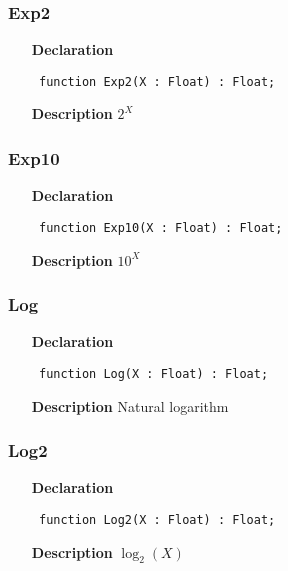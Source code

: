 \documentclass[12pt,a4paper,oneside]{report}
\newcommand{\declarationitem}[1]{\textbf{#1}}
\newcommand{\descriptiontitle}[1]{\textbf{#1}}
\newcommand{\code}[1]{\texttt{#1}}
\begin{document}
\subsubsection{Exp2}
\label{umath-Exp2}
\begin{itemize}\item[\declarationitem{Declaration}\hfill]
	\begin{flushleft}
		\code{
			function Exp2(X : Float) : Float;}
		
	\end{flushleft}
	
	\par
	\item[\descriptiontitle{Description}]
	$2^X$
	
\end{itemize}
\subsubsection{Exp10}
\label{umath-Exp10}
\begin{itemize}\item[\declarationitem{Declaration}\hfill]
	\begin{flushleft}
		\code{
			function Exp10(X : Float) : Float;}
		
	\end{flushleft}
	
	\par
	\item[\descriptiontitle{Description}]
	$10^X$
	
\end{itemize}
\subsubsection{Log}
\label{umath-Log}
\begin{itemize}\item[\declarationitem{Declaration}\hfill]
	\begin{flushleft}
		\code{
			function Log(X : Float) : Float;}
		
	\end{flushleft}
	
	\par
	\item[\descriptiontitle{Description}]
	Natural logarithm
	
\end{itemize}
\subsubsection{Log2}
\label{umath-Log2}
\begin{itemize}\item[\declarationitem{Declaration}\hfill]
	\begin{flushleft}
		\code{
			function Log2(X : Float) : Float;}
		
	\end{flushleft}
	
	\par
	\item[\descriptiontitle{Description}]
	$\log_2(X)$
	
\end{itemize}
\end{document}
